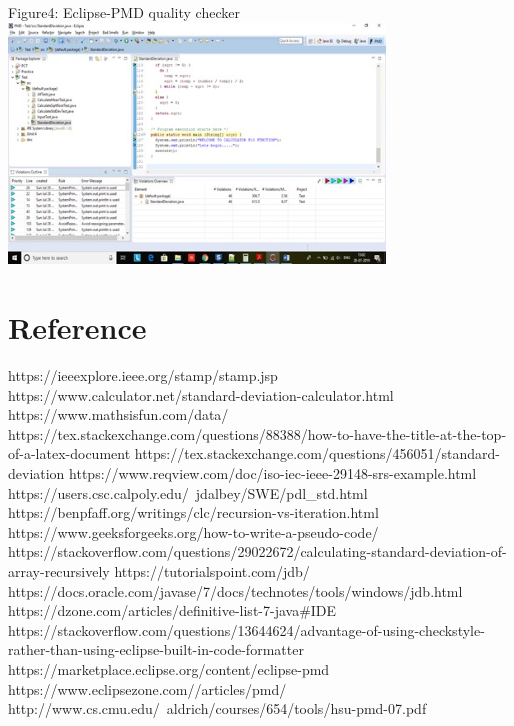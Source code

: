 \documentclass[a4paper,12pt]{article}
\begin{document}
\begin{titlepage}
\newline
Figure4: Eclipse-PMD quality checker\\
\includegraphics[width=10.0cm]{PMD-SC.jpg}\\

\section{Reference}



https://ieeexplore.ieee.org/stamp/stamp.jsp\newline
https://www.calculator.net/standard-deviation-calculator.html\newline
https://www.mathsisfun.com/data/\newline
https://tex.stackexchange.com/questions/88388/how-to-have-the-title-at-the-top-of-a-latex-document\newline
https://tex.stackexchange.com/questions/456051/standard-deviation\newline
https://www.reqview.com/doc/iso-iec-ieee-29148-srs-example.html\newline
https://users.csc.calpoly.edu/~jdalbey/SWE/pdl_std.html\newline
https://benpfaff.org/writings/clc/recursion-vs-iteration.html\newline
https://www.geeksforgeeks.org/how-to-write-a-pseudo-code/\newline
https://stackoverflow.com/questions/29022672/calculating-standard-deviation-of-array-recursively\newline
https://tutorialspoint.com/jdb/\newline
https://docs.oracle.com/javase/7/docs/technotes/tools/windows/jdb.html\newline
https://dzone.com/articles/definitive-list-7-java#IDE%
https://stackoverflow.com/questions/13644624/advantage-of-using-checkstyle-rather-than-using-eclipse-built-in-code-formatter\newline
https://marketplace.eclipse.org/content/eclipse-pmd\\
https://www.eclipsezone.com//articles/pmd/\\
http://www.cs.cmu.edu/~aldrich/courses/654/tools/hsu-pmd-07.pdf\\


\end{titlepage}
\end{document}

